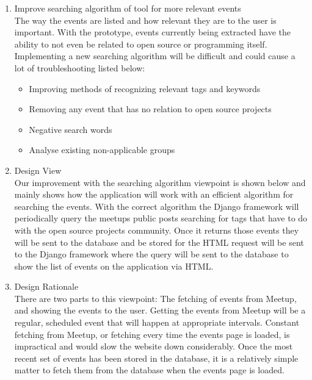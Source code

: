 \documentclass[draftclsnofoot,10pt,onecolumn]{IEEEtran} %
\begin{document}
\begin{enumerate}
\begin{enumerate}
\begin{enumerate}
				\item Improve searching algorithm of tool for more relevant events\\
				The way the events are listed and how relevant they are to the user is important. With the prototype, events
				currently being extracted have the ability to not even be related to open source or programming itself.
				Implementing a new searching algorithm will be difficult and could cause a lot of troubleshooting listed
				below:
				\begin{itemize}
					\item Improving methods of recognizing relevant tags and keywords
					\item Removing any event that has no relation to open source projects
					\item Negative search words
					\item Analyse existing non-applicable groups \\
				\end{itemize}
				
				\item Design View \\ %
				Our improvement with the searching algorithm viewpoint is shown below and mainly shows how the
			    application will work with an efficient algorithm for searching the events. With the correct algorithm the
				Django framework will periodically query the meetups public posts searching for tags that have to do with
				the open source projects community. Once it returns those events they will be sent to the database and be
				stored for the HTML request will be sent to the
				Django framework where the query will be sent to the database to show the list of events on the application
				via HTML.\\
						
				\item Design Rationale \\
				There are two parts to this viewpoint: The fetching of events from Meetup, and showing the events to the
				user. Getting the events from Meetup will be a regular, scheduled event that will happen at appropriate
				intervals. Constant fetching from Meetup, or fetching every time the events page is loaded, is impractical
				and would slow the website down considerably. Once the most recent set of events has been stored in the
				database, it is a relatively simple matter to fetch them from the database when the events page is loaded. \\
				

\end{enumerate}
\end{enumerate}
\end{enumerate}
\end{document}
